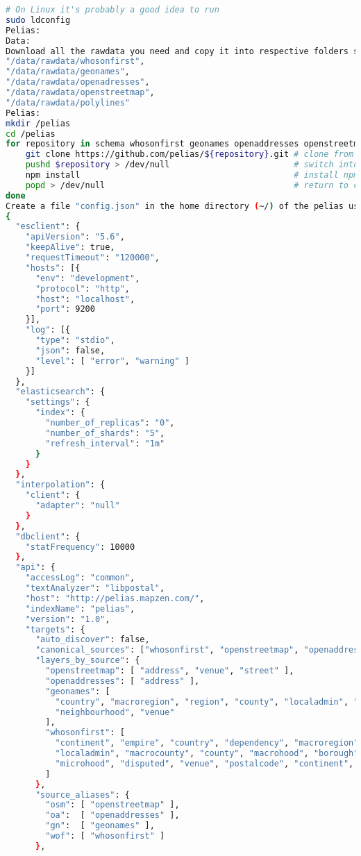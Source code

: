 \begin{lstlisting}[language=bash,breaklines=true]
# On Linux it's probably a good idea to run
sudo ldconfig
Pelias: 
Data:
Download all the rawdata you need and copy it into respective folders such as
"/data/rawdata/whosonfirst", 
"/data/rawdata/geonames", 
"/data/rawdata/openadresses", 
"/data/rawdata/openstreetmap", 
"/data/rawdata/polylines"
Pelias:
mkdir /pelias
cd /pelias
for repository in schema whosonfirst geonames openaddresses openstreetmap polylines api placeholder interpolation pip-service; do
	git clone https://github.com/pelias/${repository}.git # clone from Github
	pushd $repository > /dev/null                         # switch into importer directory
	npm install                                           # install npm dependencies
	popd > /dev/null                                      # return to code directory
done
Create a file "config.json" in the home directory (~/) of the pelias user. Paste following into pelias.json:
{
  "esclient": {
    "apiVersion": "5.6",
    "keepAlive": true,
    "requestTimeout": "120000",
    "hosts": [{
      "env": "development",
      "protocol": "http",
      "host": "localhost",
      "port": 9200
    }],
    "log": [{
      "type": "stdio",
      "json": false,
      "level": [ "error", "warning" ]
    }]
  },
  "elasticsearch": {
    "settings": {
      "index": {
        "number_of_replicas": "0",
        "number_of_shards": "5",
        "refresh_interval": "1m"
      }
    }
  },
  "interpolation": {
    "client": {
      "adapter": "null"
    }
  },
  "dbclient": {
    "statFrequency": 10000
  },
  "api": {
    "accessLog": "common",
    "textAnalyzer": "libpostal",
    "host": "http://pelias.mapzen.com/",
    "indexName": "pelias",
    "version": "1.0",
    "targets": {
      "auto_discover": false,
      "canonical_sources": ["whosonfirst", "openstreetmap", "openaddresses", "geonames"],
      "layers_by_source": {
        "openstreetmap": [ "address", "venue", "street" ],
        "openaddresses": [ "address" ],
        "geonames": [
          "country", "macroregion", "region", "county", "localadmin", "locality", "borough",
          "neighbourhood", "venue"
        ],
        "whosonfirst": [
          "continent", "empire", "country", "dependency", "macroregion", "region", "locality",
          "localadmin", "macrocounty", "county", "macrohood", "borough", "neighbourhood",
          "microhood", "disputed", "venue", "postalcode", "continent", "ocean", "marinearea"
        ]
      },
      "source_aliases": {
        "osm": [ "openstreetmap" ],
        "oa":  [ "openaddresses" ],
        "gn":  [ "geonames" ],
        "wof": [ "whosonfirst" ]
      },

\end{lstlisting}
